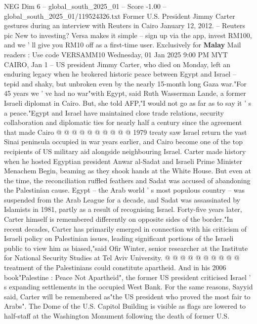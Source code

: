 \begin{textsample}{NEG Dim 6 – global\_south\_2025\_01 – Score -1.00 – global\_south\_2025\_01/119524326.txt}  \label{ex:f6_neg_003}
Former U.S.
President Jimmy Carter gestures during an interview with Reuters in Cairo January 12, 2012. -- Reuters pic New to investing?
Versa makes it simple -- sign up via the app, invest RM100, and we ' ll give you RM10 off as a first-time user.
Exclusively for \textbf{Malay} Mail readers : Use code VERSAMM10 Wednesday, 01 Jan 2025 9:00 PM MYT CAIRO, Jan 1 -- US president Jimmy Carter, who died on Monday, left an enduring legacy when he brokered historic peace between Egypt and Israel -- tepid and shaky, but unbroken even by the nearly 15-month long Gaza war."For 45 years we ' ve had no war"with Egypt, said Ruth Wasserman Lande, a former Israeli diplomat in Cairo.
But, she told AFP,"I would not go as far as to say it ' s a peace."Egypt and Israel have maintained close trade relations, security collaboration and diplomatic ties for nearly half a century since the agreement that made Cairo @ @ @ @ @ @ @ @ @ @ 1979 treaty saw Israel return the vast Sinai peninsula occupied in war years earlier, and Cairo become one of the top recipients of US military aid alongside neighbouring Israel.
Carter made history when he hosted Egyptian president Anwar al-Sadat and Israeli Prime Minister Menachem Begin, beaming as they shook hands at the White House.
But even at the time, the reconciliation ruffled feathers and Sadat was accused of abandoning the Palestinian cause.
Egypt -- the Arab world ' s most populous country -- was suspended from the Arab League for a decade, and Sadat was assassinated by Islamists in 1981, partly as a result of recognising Israel.
Forty-five years later, Carter himself is remembered differently on opposite sides of the border."In recent decades, Carter has primarily emerged in connection with his criticism of Israeli policy on Palestinian issues, leading significant portions of the Israeli public to view him as biased,"said Ofir Winter, senior researcher at the Institute for National Security Studies at Tel Aviv University. @ @ @ @ @ @ @ @ @ @ treatment of the Palestinians could constitute apartheid.
And in his 2006 book"Palestine : Peace Not Apartheid", the former US president criticised Israel ' s expanding settlements in the occupied West Bank.
For the same reasons, Sayyid said, Carter will be remembered as"the US president who proved the most fair to Arabs".
The Dome of the U.S.
Capitol Building is visible as flags are lowered to half-staff at the Washington Monument following the death of former U.S.

\end{textsample}
